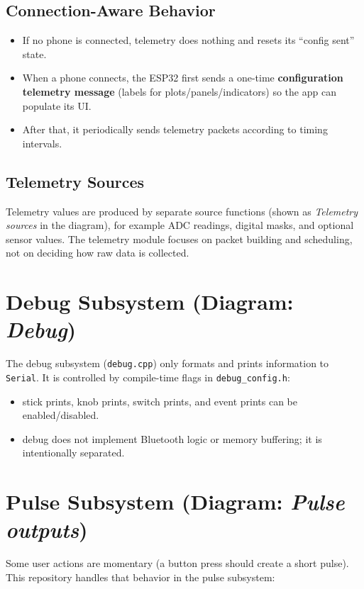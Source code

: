 \subsection{Connection-Aware Behavior}
\begin{itemize}
    \item If no phone is connected, telemetry does nothing and resets its ``config sent'' state.
    \item When a phone connects, the ESP32 first sends a one-time \textbf{configuration telemetry message}
    (labels for plots/panels/indicators) so the app can populate its UI.
    \item After that, it periodically sends telemetry packets according to timing intervals.
\end{itemize}

\subsection{Telemetry Sources}
Telemetry values are produced by separate source functions (shown as \textit{Telemetry sources} in the diagram),
for example ADC readings, digital masks, and optional sensor values.
The telemetry module focuses on packet building and scheduling, not on deciding how raw data is collected.

\section{Debug Subsystem (Diagram: \textit{Debug})}

The debug subsystem (\texttt{debug.cpp}) only formats and prints information to \texttt{Serial}.
It is controlled by compile-time flags in \texttt{debug\_config.h}:

\begin{itemize}
    \item stick prints, knob prints, switch prints, and event prints can be enabled/disabled.
    \item debug does not implement Bluetooth logic or memory buffering; it is intentionally separated.
\end{itemize}

\section{Pulse Subsystem (Diagram: \textit{Pulse outputs})}

Some user actions are momentary (a button press should create a short pulse).
This repository handles that behavior in the pulse subsystem:

